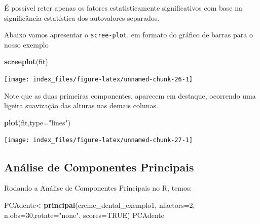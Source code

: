\documentclass[12pt,brazil,oneside]{book}
\newenvironment{Shaded}{\begin{snugshade}}{\end{snugshade}}
\newcommand{\DataTypeTok}[1]{\textcolor[rgb]{0.13,0.29,0.53}{#1}}
\newcommand{\DecValTok}[1]{\textcolor[rgb]{0.00,0.00,0.81}{#1}}
\newcommand{\KeywordTok}[1]{\textcolor[rgb]{0.13,0.29,0.53}{\textbf{#1}}}
\newcommand{\NormalTok}[1]{#1}
\newcommand{\OtherTok}[1]{\textcolor[rgb]{0.56,0.35,0.01}{#1}}
\newcommand{\StringTok}[1]{\textcolor[rgb]{0.31,0.60,0.02}{#1}}
\begin{document}
É possível reter apenas os fatores estatisticamente significativos com base na significância estatística dos autovalores separados.

Abaixo vamos apresentar o \texttt{scree-plot}, em formato do gráfico de barras para o nosso exemplo

\begin{Shaded}
\begin{Highlighting}[]
\KeywordTok{screeplot}\NormalTok{(fit)}
\end{Highlighting}
\end{Shaded}

\begin{center}\texttt{[image: index\_files/figure-latex/unnamed-chunk-26-1]} \end{center}

Note que as duas primeiras componentes, aparecem em destaque, ocorrendo uma ligeira suavização das alturas nas demais colunas.

\begin{Shaded}
\begin{Highlighting}[]
\KeywordTok{plot}\NormalTok{(fit,}\DataTypeTok{type=}\StringTok{"lines"}\NormalTok{)}
\end{Highlighting}
\end{Shaded}

\begin{center}\texttt{[image: index\_files/figure-latex/unnamed-chunk-27-1]} \end{center}

\hypertarget{analise-de-componentes-principais}{%
\subsection{Análise de Componentes Principais}\label{analise-de-componentes-principais}}

Rodando a Análise de Componentes Principais no R, temos:

\begin{Shaded}
\begin{Highlighting}[]
\NormalTok{PCAdente<-}\KeywordTok{principal}\NormalTok{(creme_dental_exemplo1, }\DataTypeTok{nfactors=}\DecValTok{2}\NormalTok{,}
                \DataTypeTok{n.obs=}\DecValTok{30}\NormalTok{,}\DataTypeTok{rotate=}\StringTok{"none"}\NormalTok{, }\DataTypeTok{scores=}\OtherTok{TRUE}\NormalTok{)}
\NormalTok{PCAdente}
\end{Highlighting}
\end{Shaded}
\end{document}

